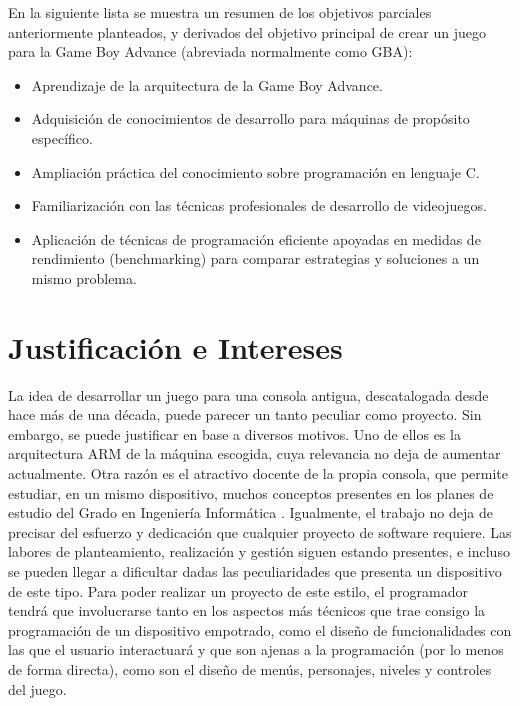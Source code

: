 En la siguiente lista se muestra  un resumen de los objetivos parciales anteriormente planteados, y derivados del objetivo principal de crear un juego para la Game Boy Advance (abreviada normalmente como GBA):

\begin{itemize}
	\item Aprendizaje de la arquitectura de la Game Boy Advance.
	\item Adquisición de conocimientos de desarrollo para máquinas de propósito específico.
	\item Ampliación práctica del conocimiento sobre programación en lenguaje C.
	\item Familiarización con las técnicas profesionales de desarrollo de videojuegos.
	\item Aplicación de técnicas de programación eficiente apoyadas en medidas de rendimiento (benchmarking) para comparar estrategias y soluciones a un mismo problema.
\end{itemize}

\section{Justificación e Intereses}

La idea de desarrollar un juego para una consola antigua, descatalogada desde hace más de una década, puede parecer un tanto peculiar como proyecto. Sin embargo, se puede justificar en base a diversos motivos. Uno de ellos es la arquitectura ARM\cite{bib:arm_book} de la máquina escogida, cuya relevancia no deja de aumentar actualmente. Otra razón es el atractivo docente de la propia consola, que permite estudiar, en un mismo dispositivo, muchos conceptos presentes en los planes de estudio del Grado en Ingeniería Informática \cite{bib:paper_2}. Igualmente, el trabajo no deja de precisar del esfuerzo y dedicación que cualquier proyecto de software requiere. Las labores de planteamiento, realización y gestión siguen estando presentes, e incluso se pueden llegar a dificultar dadas las peculiaridades que presenta un dispositivo de este tipo. Para poder realizar un proyecto de este estilo, el programador tendrá que involucrarse tanto en los aspectos más técnicos que trae consigo la programación de un dispositivo empotrado, como el diseño de funcionalidades con las que el usuario interactuará y que son ajenas a la programación (por lo menos de forma directa), como son el diseño de menús, personajes, niveles y controles del juego.

